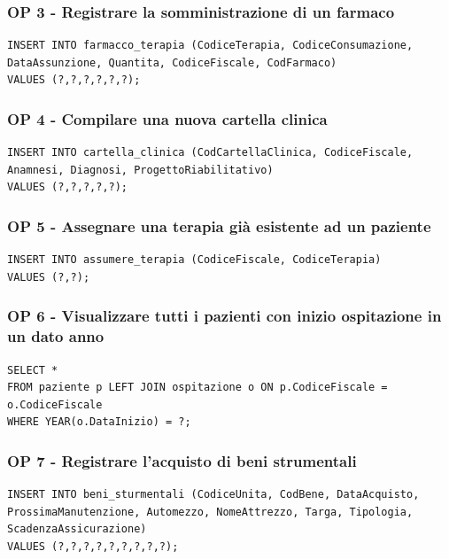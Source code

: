 \documentclass[a4paper, 12pt]{report}
\begin{document}
\subsubsection*{OP 3 - Registrare la somministrazione di un farmaco}
\begin{lstlisting}[breaklines=true]
INSERT INTO farmacco_terapia (CodiceTerapia, CodiceConsumazione, DataAssunzione, Quantita, CodiceFiscale, CodFarmaco)
VALUES (?,?,?,?,?,?);
\end{lstlisting}

\subsubsection*{OP 4 - Compilare una nuova cartella clinica}
\begin{lstlisting}[breaklines=true]
INSERT INTO cartella_clinica (CodCartellaClinica, CodiceFiscale, Anamnesi, Diagnosi, ProgettoRiabilitativo) 
VALUES (?,?,?,?,?);
\end{lstlisting}

\subsubsection*{OP 5 - Assegnare una terapia già esistente ad un paziente}
\begin{lstlisting}[breaklines=true]
INSERT INTO assumere_terapia (CodiceFiscale, CodiceTerapia)
VALUES (?,?);
\end{lstlisting}

\subsubsection*{OP 6 - Visualizzare tutti i pazienti con inizio ospitazione in un dato anno}
\begin{lstlisting}[breaklines=true]
SELECT *
FROM paziente p LEFT JOIN ospitazione o ON p.CodiceFiscale = o.CodiceFiscale
WHERE YEAR(o.DataInizio) = ?;
\end{lstlisting}

\subsubsection*{OP 7 - Registrare l'acquisto di beni strumentali}
\begin{lstlisting}[breaklines=true]
INSERT INTO beni_sturmentali (CodiceUnita, CodBene, DataAcquisto, ProssimaManutenzione, Automezzo, NomeAttrezzo, Targa, Tipologia, ScadenzaAssicurazione)
VALUES (?,?,?,?,?,?,?,?,?);
\end{lstlisting}
\end{document}
